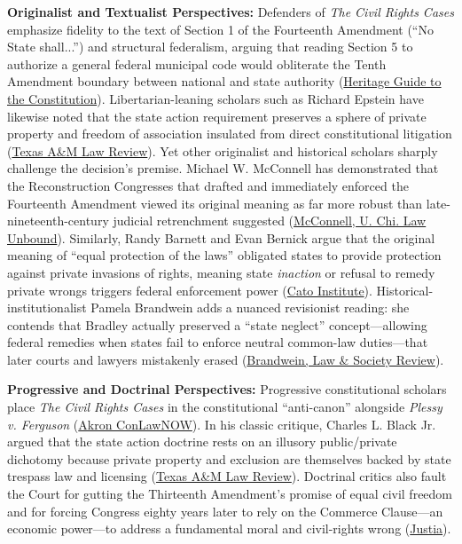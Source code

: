 \documentclass[12pt]{article}
\begin{document}
\textbf{Originalist and Textualist Perspectives:} Defenders of \textit{The Civil Rights Cases} emphasize fidelity to the text of Section 1 of the Fourteenth Amendment (``No State shall...'') and structural federalism, arguing that reading Section 5 to authorize a general federal municipal code would obliterate the Tenth Amendment boundary between national and state authority (\href{https://constitution.heritage.org/essays/amdt-14-s1-b/}{Heritage Guide to the Constitution}). Libertarian-leaning scholars such as Richard Epstein have likewise noted that the state action requirement preserves a sphere of private property and freedom of association insulated from direct constitutional litigation (\href{https://scholarship.law.tamu.edu/cgi/viewcontent.cgi?article=1359&context=lawreview}{Texas A\&M Law Review}). Yet other originalist and historical scholars sharply challenge the decision's premise. Michael W. McConnell has demonstrated that the Reconstruction Congresses that drafted and immediately enforced the Fourteenth Amendment viewed its original meaning as far more robust than late-nineteenth-century judicial retrenchment suggested (\href{https://chicagounbound.uchicago.edu/cgi/viewcontent.cgi?article=12612&context=journal_articles}{McConnell, U. Chi. Law Unbound}). Similarly, Randy Barnett and Evan Bernick argue that the original meaning of ``equal protection of the laws'' obligated states to provide protection against private invasions of rights, meaning state \textit{inaction} or refusal to remedy private wrongs triggers federal enforcement power (\href{https://www.cato.org/blog/new-decision-considers-federal-power-criminalize-civil-rights-violations}{Cato Institute}). Historical-institutionalist Pamela Brandwein adds a nuanced revisionist reading: she contends that Bradley actually preserved a ``state neglect'' concept---allowing federal remedies when states fail to enforce neutral common-law duties---that later courts and lawyers mistakenly erased (\href{https://www.cambridge.org/core/journals/law-and-society-review/article/judicial-abandonment-of-blacks-rethinking-the-state-action-cases-of-the-waite-court/6EFE4577A05FAA2791AB1541BFBFC371}{Brandwein, Law \& Society Review}).

\textbf{Progressive and Doctrinal Perspectives:} Progressive constitutional scholars place \textit{The Civil Rights Cases} in the constitutional ``anti-canon'' alongside \textit{Plessy v. Ferguson} (\href{https://ideaexchange.uakron.edu/cgi/viewcontent.cgi?article=1127&context=conlawnow}{Akron ConLawNOW}). In his classic critique, Charles L. Black Jr. argued that the state action doctrine rests on an illusory public/private dichotomy because private property and exclusion are themselves backed by state trespass law and licensing (\href{https://scholarship.law.tamu.edu/cgi/viewcontent.cgi?article=1359&context=lawreview}{Texas A\&M Law Review}). Doctrinal critics also fault the Court for gutting the Thirteenth Amendment's promise of equal civil freedom and for forcing Congress eighty years later to rely on the Commerce Clause---an economic power---to address a fundamental moral and civil-rights wrong (\href{https://supreme.justia.com/cases/federal/us/379/241/}{Justia}).
\end{document}
